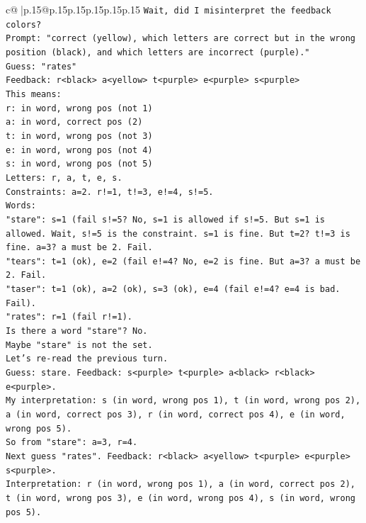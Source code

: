 \documentclass{article}
\begin{document}
{\begin{supertabular}{c@{$\;$}|p{.15\linewidth}@{}p{.15\linewidth}p{.15\linewidth}p{.15\linewidth}p{.15\linewidth}p{.15\linewidth}}
{{{\texttt{Wait, did I misinterpret the feedback colors?} \\
\texttt{Prompt: "correct (yellow), which letters are correct but in the wrong position (black), and which letters are incorrect (purple)."} \\
\texttt{Guess: "rates"} \\
\texttt{Feedback: r<black> a<yellow> t<purple> e<purple> s<purple>} \\
\texttt{This means:} \\
\texttt{r: in word, wrong pos (not 1)} \\
\texttt{a: in word, correct pos (2)} \\
\texttt{t: in word, wrong pos (not 3)} \\
\texttt{e: in word, wrong pos (not 4)} \\
\texttt{s: in word, wrong pos (not 5)} \\
\texttt{Letters: r, a, t, e, s.} \\
\texttt{Constraints: a=2. r!=1, t!=3, e!=4, s!=5.} \\
\texttt{Words:} \\
\texttt{"stare": s=1 (fail s!=5? No, s=1 is allowed if s!=5. But s=1 is allowed. Wait, s!=5 is the constraint. s=1 is fine. But t=2? t!=3 is fine. a=3? a must be 2. Fail.} \\
\texttt{"tears": t=1 (ok), e=2 (fail e!=4? No, e=2 is fine. But a=3? a must be 2. Fail.} \\
\texttt{"taser": t=1 (ok), a=2 (ok), s=3 (ok), e=4 (fail e!=4? e=4 is bad. Fail).} \\
\texttt{"rates": r=1 (fail r!=1).} \\
\texttt{Is there a word "stare"? No.} \\
\texttt{Maybe "stare" is not the set.} \\
\texttt{Let's re{-}read the previous turn.} \\
\texttt{Guess: stare. Feedback: s<purple> t<purple> a<black> r<black> e<purple>.} \\
\texttt{My interpretation: s (in word, wrong pos 1), t (in word, wrong pos 2), a (in word, correct pos 3), r (in word, correct pos 4), e (in word, wrong pos 5).} \\
\texttt{So from "stare": a=3, r=4.} \\
\texttt{Next guess "rates". Feedback: r<black> a<yellow> t<purple> e<purple> s<purple>.} \\
\texttt{Interpretation: r (in word, wrong pos 1), a (in word, correct pos 2), t (in word, wrong pos 3), e (in word, wrong pos 4), s (in word, wrong pos 5).} \\
}}}
\end{supertabular}}
\end{document}

